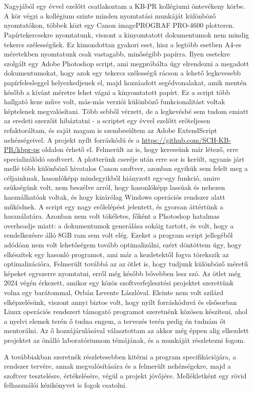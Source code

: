 \chapter{\bevezetes}

Nagyjából egy évvel ezelőtt csatlakoztam a KB-PR kollégiumi öntevékeny körbe. A kör végzi a kollégium szinte minden nyomtatási munkáját különböző nyomtatókon, többek közt egy Canon imagePROGRAF PRO-4600 plotteren. Papírtekercsekre nyomtatunk, viszont a kinyomtatott dokumentumok nem mindig tekercs szélességűek. Ez kimondottan gyakori eset, hisz a legtöbb esetben A4-es méretekben nyomtatunk csak vastagabb, minőségibb papírra. Ilyen esetekre szolgált egy Adobe Photoshop script, ami megpróbálta úgy elrendezni a megadott dokumentumokat, hogy azok egy tekercs szélességű rácson a lehető legkevesebb papírfelesleggel helyezkedjenek el, majd hozzáadott segédvonalakat, amik mentén később a kívánt méretre lehet vágni a kinyomtatott papírt.
Ez a script több hallgató keze műve volt, más-más verziói különböző funkcionalitást voltak képtelenek megvalósítani. Több sebből vérzett, de a legkevésbé sem tudom emiatt az eredeti szerzőit hibáztatni - a scriptet egy évvel ezelőtt erőteljesen refaktoráltam, és saját magam is szembesültem az Adobe ExtendScript nehézségeivel. A projekt nyílt forráskódú és a \href{https://github.com/SCH-KB-PR/kbpr-ps}{https://github.com/SCH-KB-PR/kbpr-ps} oldalon érhető el.
Felmerült az is, hogy keressünk már létező, erre specializálódó szoftvert. A plotterünk cseréje után erre sor is került, ugyanis járt mellé több különböző hivatalos Canon szoftver, azonban egyikük sem felelt meg a céljainknak, hasonlóképp mindegyikből hiányzott egy-egy funkció, amire szükségünk volt, nem beszélve arról, hogy hasonlóképp lassúak és nehezen használhatóak voltak, és hogy kizárólag Windows operációs rendszer alatt működnek.
A script egy nagy erőlelépést jelentett, és gyorsan áttértünk a használatára. Azonban nem volt tökéletes, főként a Photoshop hatalmas overheadje miatt: a dokumentumok generálása sokáig tartott, és volt, hogy a rendelkezésre álló 8GB ram sem volt elég. Ezeket a program script jellegéből adódóan nem volt lehetőségem tovább optimalizálni, ezért döntöttem úgy, hogy elkészítek egy hasonló programot, ami már a kezdetektől fogva törekszik az optimalizációra. Felmerült továbbá az az ötlet is, hogy tudjunk különböző méretű képeket egyszerre nyomtatni, erről még később bővebben lesz szó.
Az ötlet még 2024 végén érkezett, amikor egy közös szoftverfejlesztési projektet szerettünk volna egy barátommal, Orbán Levente Lászlóval. Eleinte nem volt szilárd elképzelésünk, viszont annyi biztos volt, hogy nyílt forráskóduvá és elsősorban Linux operációs rendszert támogató programot szeretnénk közösen készíteni, ahol a nyelvi elemek terén ő tudna engem, a tervezés terén pedig én tudnám őt mentorálni. Az ő hozzájárulásával választottam az akkor még éppen alig elkezdett projektet az önálló laboratóriumom témájának, és a munkáját részletezni fogom.

A továbbiakban szeretnék részletesebben kitérni a program specifikációjára, a rendszer tervére, annak megvalósítására és a felmerült nehézségekre, majd a szoftver tesztelésre, értékelésére, végül a projekt jövőjére. Mellékletként egy rövid felhasználói kézikönyvet is fogok csatolni.